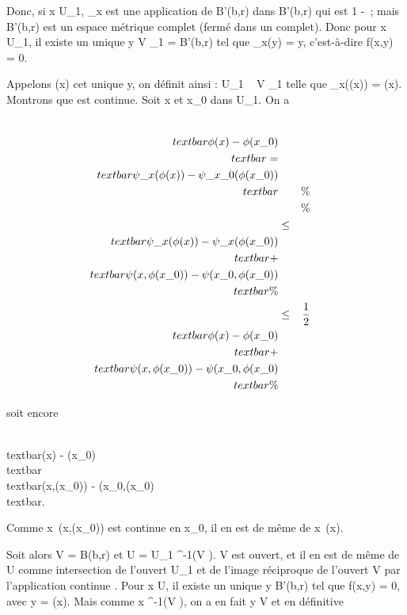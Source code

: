 \documentclass[]{article}
\begin{document}
Donc, si x \in U\_1, \psi\_x est une application de B'(b,r)
dans B'(b,r) qui est  1 
-\textcontractante~; mais B'(b,r) est un espace
métrique complet (fermé dans un complet). Donc pour x \in U\_1, il
existe un unique y \in V \_1 = B'(b,r) tel que \psi\_x(y) =
y, c'est-à-dire f(x,y) = 0.

Appelons \phi(x) cet unique y, on définit ainsi \phi : U\_1 \rightarrow~ V
\_1 telle que \psi\_x(\phi(x)) = \phi(x). Montrons que \phi est
continue. Soit x et x\_0 dans U\_1. On a

\begin{align*} \\textbar{}\phi(x) -
\phi(x\_0)\\textbar{} =\\textbar{}
\psi\_x(\phi(x)) -
\psi\_x\_0(\phi(x\_0))\\textbar{}&&
\%& \\ & & \%&
\\ & \leq&
\\textbar{}\psi\_x(\phi(x)) -
\psi\_x(\phi(x\_0))\\textbar{}
+\\textbar{} \psi(x,\phi(x\_0)) -
\psi(x\_0,\phi(x\_0))\\textbar{}\%&
\\ & \leq& 1 \over 2
\\textbar{}\phi(x) -
\phi(x\_0)\\textbar{} +\\textbar{}
\psi(x,\phi(x\_0)) -
\psi(x\_0,\phi(x\_0)\\textbar{} \%&
\\ \end{align*}

soit encore

\\textbar{}\phi(x) -
\phi(x\_0)\\textbar{} \\textbar{}\psi(x,\phi(x\_0)) -
\psi(x\_0,\phi(x\_0)\\textbar{}.

Comme x\mapsto~\psi(x,\phi(x\_0)) est continue en
x\_0, il en est de même de x\mapsto~\phi(x).

Soit alors V = B(b,r) et U = U\_1 \bigcap \phi^-1(V ). V est
ouvert, et il en est de même de U comme intersection de l'ouvert
U\_1 et de l'image réciproque de l'ouvert V par l'application
continue \phi. Pour x \in U, il existe un unique y \in B'(b,r) tel que f(x,y) =
0, avec y = \phi(x). Mais comme x \in \phi^-1(V ), on a en fait y \in V
et en définitive
\end{document}
